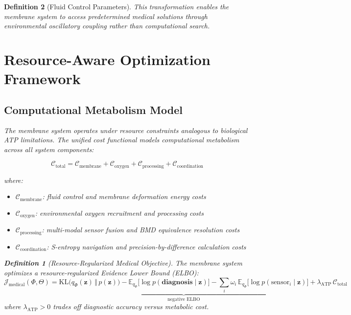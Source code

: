 \documentclass[12pt,a4paper]{article}
\newtheorem{definition}{Definition}
\begin{document}
\begin{definition}[Fluid Control Parameters]
This transformation enables the membrane system to access predetermined medical solutions through environmental oscillatory coupling rather than computational search.

\section{Resource-Aware Optimization Framework}

\subsection{Computational Metabolism Model}

The membrane system operates under resource constraints analogous to biological ATP limitations. The unified cost functional models computational metabolism across all system components:

\begin{equation}
\mathcal{C}_{\text{total}} = \mathcal{C}_{\text{membrane}} + \mathcal{C}_{\text{oxygen}} + \mathcal{C}_{\text{processing}} + \mathcal{C}_{\text{coordination}}
\end{equation}

where:
\begin{itemize}
\item $\mathcal{C}_{\text{membrane}}$: fluid control and membrane deformation energy costs
\item $\mathcal{C}_{\text{oxygen}}$: environmental oxygen recruitment and processing costs  
\item $\mathcal{C}_{\text{processing}}$: multi-modal sensor fusion and BMD equivalence resolution costs
\item $\mathcal{C}_{\text{coordination}}$: S-entropy navigation and precision-by-difference calculation costs
\end{itemize}

\begin{definition}[Resource-Regularized Medical Objective]
The membrane system optimizes a resource-regularized Evidence Lower Bound (ELBO):
\begin{equation}
\mathcal{J}_{\text{medical}}(\Phi,\Theta) = \underbrace{\mathrm{KL}\bigl(q_{\Phi}(\mathbf{z})\,\Vert\, p(\mathbf{z})\bigr) - \mathbb{E}_{q_{\Phi}}\bigl[\log p(\mathbf{diagnosis}\mid \mathbf{z})\bigr] - \sum_{i} \omega_i\, \mathbb{E}_{q_{\Phi}}\bigl[\log p(\text{sensor}_i \mid \mathbf{z})\bigr]}_{\text{negative ELBO}} + \lambda_{\text{ATP}} \, \mathcal{C}_{\text{total}}
\end{equation}
where $\lambda_{\text{ATP}} > 0$ trades off diagnostic accuracy versus metabolic cost.
\end{definition}


\end{definition}
\end{document}
